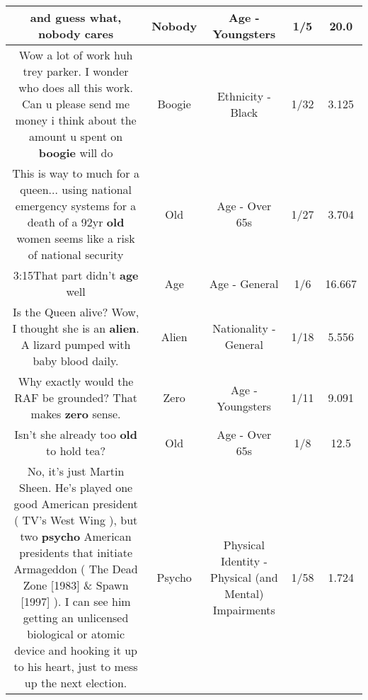 \documentclass[11pt]{article}
\newlength\mylength
\begin{document}
\begin{center}
\begin{longtable}{|C{.65\mylength}|C{.30\mylength}|C{.12\mylength}|C{.12\mylength}|C{.12\mylength}|}
  \small and guess what, \textbf{nobody} cares\normalsize   & Nobody & Age - Youngsters & 1/5 & 20.0 \\  \hline
  \small Wow a lot of work huh trey parker. I wonder who does all this work. Can u please send me money i think about the amount u spent on \textbf{boogie} will do\normalsize   & Boogie & Ethnicity - Black & 1/32 & 3.125 \\  \hline
  \small This is way to much for a queen... using national emergency systems for a death of a 92yr \textbf{old} women seems like a risk of national security\normalsize   & Old & Age - Over 65s & 1/27 & 3.704 \\  \hline
  \small 3:15That part didn't \textbf{age} well\normalsize   & Age & Age - General & 1/6 & 16.667 \\  \hline
  \small Is the Queen alive? Wow, I thought she is an \textbf{alien}. A lizard pumped with baby blood daily.\normalsize   & Alien & Nationality - General & 1/18 & 5.556 \\  \hline
  \small Why exactly would the RAF be grounded? That makes \textbf{zero} sense.\normalsize   & Zero & Age - Youngsters & 1/11 & 9.091 \\  \hline
  \small Isn't she already too \textbf{old} to hold tea?\normalsize   & Old & Age - Over 65s & 1/8 & 12.5 \\  \hline
  \small No, it's just Martin Sheen. He's played one good American president ( TV's West Wing ), but two \textbf{psycho} American presidents that initiate Armageddon ( The Dead Zone [1983] \& Spawn [1997] ). I can see him getting an unlicensed biological or atomic device and hooking it up to his heart, just to mess up the next election.\normalsize   & Psycho & Physical Identity - Physical (and Mental) Impairments & 1/58 & 1.724 \\  \hline

\end{longtable}
\end{center}
\end{document}
